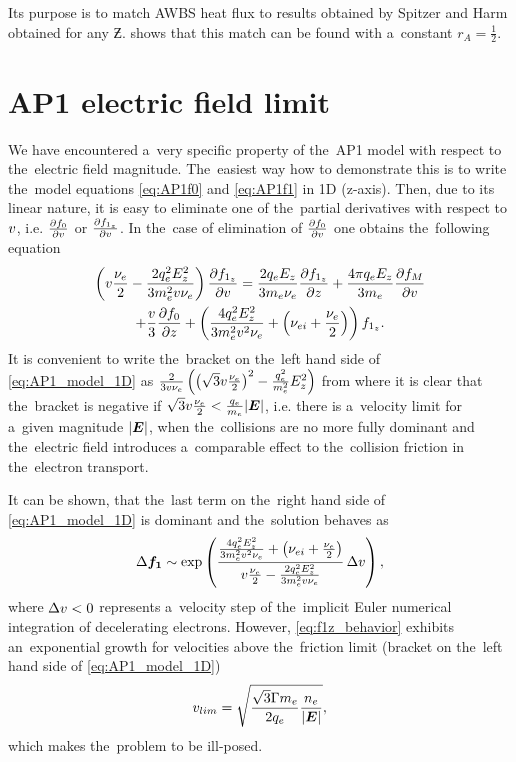 Its purpose is to
match AWBS heat flux to results obtained by Spitzer and Harm 
\cite{SpitzerHarm_PR1953} obtained for any $\Zbar$. 
 shows that this match can be found with 
a~constant $r_A=\frac{1}{2}$.


\section{AP1 electric field limit}
\label{app:AP1limit}

We have encountered a~very specific property of the~AP1 model
with respect to the~electric field magnitude. The~easiest way how to 
demonstrate this is to write the~model equations \eqref{eq:AP1f0} and 
\eqref{eq:AP1f1} in 1D (z-axis). Then, due to its linear nature, it is easy 
to eliminate one of the~partial derivatives with respect to $v$, i.e. 
$\frac{\partial{f_0}}{\partial{v}}$ or $\frac{\partial{f_{1_z}}}{\partial{v}}$. 
In the~case of elimination of $\frac{\partial{f_0}}{\partial{v}}$ 
one obtains the~following equation
\begin{multline}
  \left(v\frac{\nu_{e}}{2} - \frac{2q_e^2E_z^2}{3m_e^2v\nu_{e}}\right) 
  \frac{\partial{f_{1_z}}}{\partial{v}} 
  =
  \frac{2q_eE_z}{3m_e\nu_{e}}\frac{\partial{f_{1_z}}}{\partial{z}}  
  + \frac{4\pi q_eE_z}{3m_e}\frac{\partial{f_M}}{\partial{v}} \\
  + \frac{v}{3}\frac{\partial{f_0}}{\partial{z}} 
  + \left(\frac{4q_e^2E_z^2}{3m_e^2v^2\nu_{e}}
  + \left(\nu_{ei} + \frac{\nu_{e}}{2}\right) \right)f_{1_z} .
  \label{eq:AP1_model_1D}
\end{multline}
It is convenient to write the~bracket on the~left hand side of 
\eqref{eq:AP1_model_1D} as
$\frac{2}{3v\nu_{e}} 
\left(\left(\sqrt{3}v\frac{\nu_{e}}{2}\right)^2 
- \frac{q_e^2}{m_e^2}E_z^2\right)$
from where it is clear that the~bracket is negative if 
$\sqrt{3}v\frac{\nu_{e}}{2} < \frac{q_e}{m_e}|\boldsymbol{E}|$, 
i.e. there is a~velocity limit for a~given magnitude $|\boldsymbol{E}|$, 
when the~collisions are no more fully dominant and the~electric field 
introduces a~comparable effect to the~collision friction in 
the~electron transport.

It can be shown, that the~last term on the~right hand side of 
\eqref{eq:AP1_model_1D} is dominant and the~solution behaves as 
\begin{equation}
  \Delta {\boldsymbol{f_1}} \sim \exp\left(\frac{\frac{4q_e^2E_z^2}{3m_e^2v^2\nu_{e}}
  + \left(\nu_{ei} + \frac{\nu_{e}}{2}\right)}
  {v\frac{\nu_{e}}{2} - \frac{2q_e^2E_z^2}{3m_e^2v\nu_{e}}}\, 
  \Delta v\right) ,
  \label{eq:f1z_behavior}
\end{equation}
where $\Delta v < 0$ represents a~velocity step of the~implicit Euler
numerical integration of decelerating electrons.
However, \eqref{eq:f1z_behavior} exhibits an~exponential growth 
for velocities above the~friction limit (bracket on the~left hand side of 
\eqref{eq:AP1_model_1D})
\begin{equation}
  v_{lim}  = \sqrt{\frac{\sqrt{3}\Gamma m_e}{2q_e}\frac{n_e}{|\boldsymbol{E}|}} ,
  \label{app_eq:v_limit}
\end{equation}
which makes the~problem to be ill-posed.

